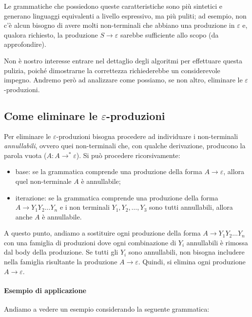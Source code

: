 \documentclass[class=book, crop=false, oneside]{standalone}
\begin{document}
Le grammatiche che possiedono queste caratteristiche sono più sintetici e generano linguaggi equivalenti a livello espressivo, ma più puliti; ad esempio, non c'è alcun bisogno di avere molti non-terminali che abbiano una produzione in \(\varepsilon\) e, qualora richiesto, la produzione \(S \rightarrow \varepsilon\) sarebbe sufficiente allo scopo (da approfondire).

Non è nostro interesse entrare nel dettaglio degli algoritmi per effettuare questa pulizia, poiché dimostrarne la correttezza richiederebbe un considerevole impegno. Andremo però ad analizzare come possiamo, se non altro,  eliminare le \(\varepsilon\)-produzioni.

\subsection{Come eliminare le \(\varepsilon\)-produzioni}
Per eliminare le \(\varepsilon\)-produzioni bisogna procedere ad individuare i non-terminali \emph{annullabili}, ovvero quei non-terminali che, con qualche derivazione, producono la parola vuota (\(A : A \rightarrow^* \varepsilon\)). Si può procedere ricorsivamente:
\begin{itemize}
  \item base: se la grammatica comprende una produzione della forma \(A \rightarrow \varepsilon\), allora quel non-terminale \(A\) è annullabile;
  \item iterazione: se la grammatica comprende una produzione della forma \(A \rightarrow Y_1Y_2 \ldots Y_n\) e i non terminali \(Y_1, Y_2, \ldots, Y_3\) sono tutti annullabili, allora anche \(A\) è annullabile.
\end{itemize}
A questo punto, andiamo a sostituire ogni produzione della forma \(A \rightarrow Y_1Y_2 \ldots Y_n\) con una famiglia di produzioni dove ogni combinazione di \(Y_i\) annullabili è rimossa dal body della produzione. Se tutti gli \(Y_i\) sono annullabili, non bisogna includere nella famiglia risultante la produzione \(A \rightarrow \varepsilon\). Quindi, si elimina ogni produzione \(A \rightarrow \varepsilon\).

\paragraph{Esempio di applicazione}
Andiamo a vedere un esempio considerando la seguente grammatica:
%
\end{document}

